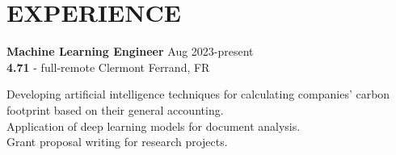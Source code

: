 \documentclass[11 pt,oneside,a4paper,titlepage]{article}
\begin{document}
{\begin{minipage}{12.3cm}


        
        \vspace*{-0.22cm}
 
 
        \section*{EXPERIENCE}

        \textbf{Machine Learning Engineer} \hfill Aug 2023\--present\\
        \textbf{4.71} \-- full-remote \hfill Clermont Ferrand, FR\\

        \vspace*{-0.2cm}
        \hspace*{0.2cm}
        \begin{minipage}{12cm}
            {\bullet} Developing artificial intelligence techniques for calculating companies' carbon footprint based on their general accounting.\\
            {\bullet} Application of deep learning models for document analysis.\\
            {\bullet} Grant proposal writing for research projects.\\
        \end{minipage}


\end{minipage}}
\end{document}
